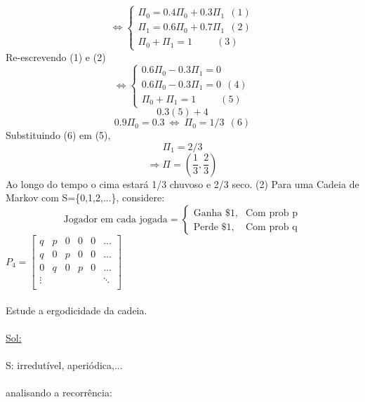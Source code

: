 \documentclass[a4paper,12pt]{article}
\begin{document}
 \begin{equation*}
 \iff 
 \begin{cases}
\Pi_0=0.4\Pi_0+0.3\Pi_1\ \ (1)\\
\Pi_1=0.6\Pi_0+0.7\Pi_1\ \ (2)\\
\Pi_0+\Pi_1=1\ \ \ \ \ \ \ \ \ \ \ (3)
 
 \end{cases}
 \end{equation*}
 \newpage
 Re-escrevendo (1) e (2)\\
  \begin{equation*}
 \iff 
 \begin{cases}
 0.6\Pi_0-0.3\Pi_1=0\ \ \\
 0.6\Pi_0-0.3\Pi_1=0\ \ (4)\\
 \Pi_0+\Pi_1=1\ \ \ \ \ \ \ \ \ \ \ (5)
 
 \end{cases}
 \end{equation*}
 $$0.3(5)+4$$
 $$0.9\Pi_0=0.3 \ \iff \ \Pi_0=1/3\ \ (6)$$
 Substituindo (6) em (5),\\
 $$\Pi_1=2/3$$
 $$\Rightarrow \Pi=\left(\frac{1}{3},\frac{2}{3}\right)$$
 Ao longo do tempo o cima estar\'a 1/3 chuvoso e 2/3 seco.
 \newpage
 (2) Para uma Cadeia de Markov com S=\{0,1,2,...\}, considere:\\
 \begin{equation*}
 \text{Jogador em cada jogada}=
 \begin{cases}
 \text{Ganha \$1}, & \text{Com prob p} \\
 \text{Perde \$1}, & \text{Com prob q}
 \end{cases}
 \end{equation*}
 $
 P_4=
 \begin{bmatrix} 
 q&p & 0&0& 0&\dots \\
 q&0& p& 0&0&\dots \\
 0&    q    &0  &p &  0&\dots\\
 \vdots& & & & &\ddots\\
 \end{bmatrix}
 $
 \\
 \\
 Estude a ergodicidade da cadeia.\\
 \\
 \underline{Sol:}\\
 \\
 S: irredutível, aperiódica,...\\
 \\
 analisando a recorrência:\\
\end{document}
